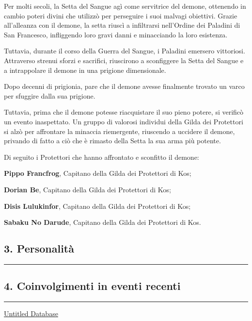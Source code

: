 Per molti secoli, la Setta del Sangue agì come servitrice del demone,
ottenendo in cambio poteri divini che utilizzò per perseguire i suoi
malvagi obiettivi. Grazie all'alleanza con il demone, la setta riuscì a
infiltrarsi nell'Ordine dei Paladini di San Francesco, infliggendo loro
gravi danni e minacciando la loro esistenza.

Tuttavia, durante il corso della Guerra del Sangue, i Paladini emersero
vittoriosi. Attraverso strenui sforzi e sacrifici, riuscirono a
sconfiggere la Setta del Sangue e a intrappolare il demone in una
prigione dimensionale.

Dopo decenni di prigionia, pare che il demone avesse finalmente trovato
un varco per sfuggire dalla sua prigione.

Tuttavia, prima che il demone potesse riacquistare il suo pieno potere,
si verificò un evento inaspettato. Un gruppo di valorosi individui della
Gilda dei Protettori si alzò per affrontare la minaccia riemergente,
riuscendo a uccidere il demone, privando di fatto a ciò che è rimasto
della Setta la sua arma più potente.

Di seguito i Protettori che hanno affrontato e sconfitto il demone:

\textbf{Pippo Francfrog}, Capitano della Gilda dei Protettori di Kos;

\textbf{Dorian Be}, Capitano della Gilda dei Protettori di Kos;

\textbf{Disis Lulukinfor}, Capitano della Gilda dei Protettori di Kos;

\textbf{Sabaku No Darude}, Capitano della Gilda dei Protettori di Kos.

\subsection{3. Personalità}\label{personalituxe0}

\begin{center}\rule{0.5\linewidth}{0.5pt}\end{center}

\subsection{4. Coinvolgimenti in eventi
recenti}\label{coinvolgimenti-in-eventi-recenti}

\begin{center}\rule{0.5\linewidth}{0.5pt}\end{center}

\href{Untitled\%20Database\%20d9fe95ba212a4a62853a4959637c5a88.csv}{Untitled
Database}

